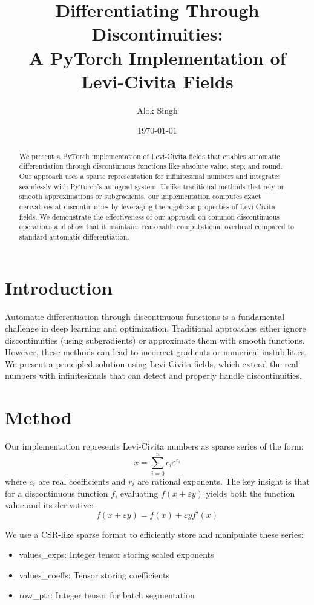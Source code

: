 \documentclass{article}
\title{Differentiating Through Discontinuities: \\
A PyTorch Implementation of Levi-Civita Fields}
\author{Alok Singh}
\date{\today}
\begin{document}
\maketitle

\begin{abstract}
We present a PyTorch implementation of Levi-Civita fields that enables automatic differentiation through discontinuous functions like absolute value, step, and round. Our approach uses a sparse representation for infinitesimal numbers and integrates seamlessly with PyTorch's autograd system. Unlike traditional methods that rely on smooth approximations or subgradients, our implementation computes exact derivatives at discontinuities by leveraging the algebraic properties of Levi-Civita fields. We demonstrate the effectiveness of our approach on common discontinuous operations and show that it maintains reasonable computational overhead compared to standard automatic differentiation.
\end{abstract}

\section{Introduction}

Automatic differentiation through discontinuous functions is a fundamental challenge in deep learning and optimization. Traditional approaches either ignore discontinuities (using subgradients) or approximate them with smooth functions. However, these methods can lead to incorrect gradients or numerical instabilities. We present a principled solution using Levi-Civita fields, which extend the real numbers with infinitesimals that can detect and properly handle discontinuities.

\section{Method}

Our implementation represents Levi-Civita numbers as sparse series of the form:
\[
x = \sum_{i=0}^n c_i \varepsilon^{r_i}
\]
where $c_i$ are real coefficients and $r_i$ are rational exponents. The key insight is that for a discontinuous function $f$, evaluating $f(x + \varepsilon y)$ yields both the function value and its derivative:
\[
f(x + \varepsilon y) = f(x) + \varepsilon y f'(x)
\]

We use a CSR-like sparse format to efficiently store and manipulate these series:
\begin{itemize}
    \item values\_exps: Integer tensor storing scaled exponents
    \item values\_coeffs: Tensor storing coefficients
    \item row\_ptr: Integer tensor for batch segmentation
\end{itemize}
\end{document}
